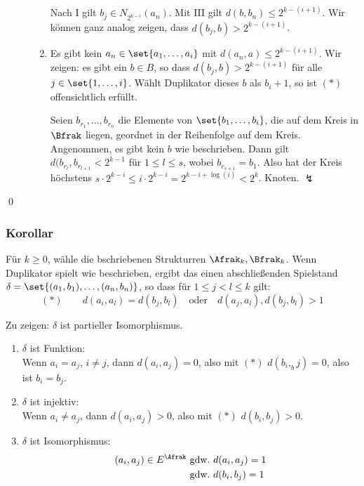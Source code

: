 \begin{description}
\begin{enumerate}
    Nach I gilt $b_j\in N_{2^{k-i}}(a_n)$. Mit III gilt $d(b,b_n)\leq 2^{k-(i+1)}$.
    Wir können ganz analog zeigen, dass $d(b_j,b)>2^{k-(i+1)}$.
    
    \item Es gibt kein $a_n\in\set{a_1,\dots,a_i}$ mit $d(a_n,a)\leq 2^{k-(i+1)}$.
    Wir zeigen: es gibt ein $b\in B$, so dass $d(b_j,b)> 2^{k-(i+1)}$ für
    alle $j\in\set{1,\dots,i}$. Wählt Duplikator dieses $b$ als $b_i+1$, so ist
    $(*)$ offensichtlich erfüllt.
    
    Seien $b_{r_1},\dots,b_{r_n}$ die Elemente von $\set{b_1,\dots,b_i}$, die auf
    dem Kreis in $\Bfrak$ liegen, geordnet in der Reihenfolge auf dem Kreis.
    Angenommen, es gibt kein $b$ wie beschrieben. Dann gilt
    $d(b_{r_l},b_{r_{l+1}} < 2^{k-1}$ für $1\leq l\leq s$, wobei $b_{r_{s+1}}=b_1$.
    Also hat der Kreis höchstens $s\cdot 2^{k-i}\leq i\cdot 2^{k-i} = 2^{k-i+\log(i)} < 2^k$.
    Knoten. $\lightning$
  \end{enumerate}
\end{description}
\qed

\subsubsection{Korollar}

Für $k\geq 0$, wähle die bschriebenen Strukturren $\Afrak_k,\Bfrak_k$.
Wenn Duplikator spielt wie beschrieben, ergibt das einen abschließenden
Spielstand $\delta=\set{(a_1,b_1),\dots,(a_n,b_n)}$, so dass für
$1\leq j<l\leq k$ gilt:
\[
  (*)\qquad d(a_i,a_l)=d(b_j,b_l) \quad\text{oder}\quad d(a_j,a_l),d(b_j,b_l) > 1
\]

Zu zeigen: $\delta$ ist partieller Isomorphismus.

\begin{enumerate}
  \item $\delta$ ist Funktion:\\
  Wenn $a_i=a_j$, $i\not=j$, dann $d(a_i,a_j)=0$, also mit $(*)$
  $d(b_i,_bj)=0$, also ist $b_i=b_j$.
  
  \item $\delta$ ist injektiv:\\
  Wenn $a_i\not=a_j$, dann $d(a_i,a_j)>0$, also mit $(*)$ $d(b_i,b_j)>0$.
  
  \item $\delta$ ist Isomorphismus:
  \begin{align*}
    (a_i,a_j)\in E^\Afrak &~\text{gdw.}~ d(a_i,a_j) = 1\\
                          &~\text{gdw.}~ d(b_i,b_j) = 1\\
  \end{align*}
\end{enumerate}

